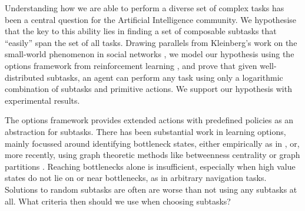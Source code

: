 \label{sec:intro}

Understanding how we are able to perform a diverse set of complex tasks has been
a central question for the Artificial Intelligence community. We hypothesise
that the key to this ability lies in finding a set of composable subtasks that
``easily'' span the set of all tasks. Drawing parallels from Kleinberg's work on
the small-world phenomenon in social networks \cite{Kleinberg}, we model our
hypothesis using the options framework from reinforcement learning
\cite{SuttonPrecupSingh1998}, and prove that given well-distributed subtasks, an
agent can perform any task using only a logarithmic combination of subtasks and
primitive actions. We support our hypothesis with experimental results.

The options framework \cite{SuttonPrecupSingh1998} provides extended actions
with predefined policies as an abstraction for subtasks. There has been
substantial work in learning options, mainly focussed around identifying
bottleneck states, either empirically as in \cite{Stolle}, or, more recently,
using graph theoretic methods like betweenness centrality \cite{Simsek} or graph
partitions \cite{Simsek2005}. Reaching bottlenecks alone is insufficient,
especially when high value states do not lie on or near bottlenecks, as in
arbitrary navigation tasks. Solutions to random subtasks are often are worse
than not using any subtasks at all. What criteria then should we use when choosing subtasks?
